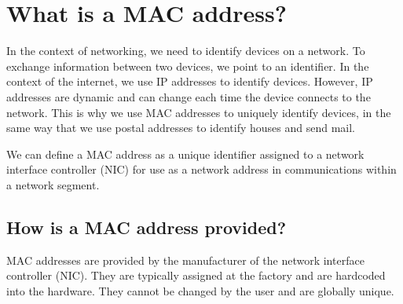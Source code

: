 \documentclass[aps,prb,twocolumn,superscriptaddress,floatfix,longbibliography,nofootinbib]{revtex4-2}
\begin{document}
\section{\label{sec:Whatis}What is a MAC address?}
  In the context of networking, we need to identify devices on a network.
  To exchange information between two devices, we point to an identifier.
  In the context of the internet, we use IP addresses to identify devices.
  However, IP addresses are dynamic and can change each time the device connects to the network.
  This is why we use MAC addresses to uniquely identify devices, in the same way 
  that we use postal addresses to identify houses and send mail.

  We can define a MAC address as a unique identifier assigned to a network interface 
  controller (NIC) for use as a network address in communications within a network segment.

  \subsection{\label{sec:Provided}How is a MAC address provided?}
  MAC addresses are provided by the manufacturer of the network interface controller (NIC).
  They are typically assigned at the factory and are hardcoded into the hardware.
  They cannot be changed by the user and are globally unique.
\end{document}
